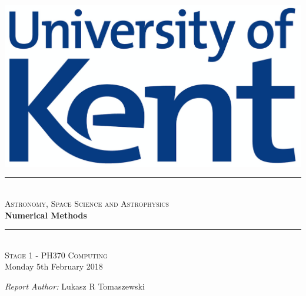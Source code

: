 \documentclass[12pt]{article}
\begin{document}
\begin{titlepage}

\newcommand{\HRule}{\rule{\linewidth}{0.5mm}}

\begin{centering} 
 

\includegraphics[scale=0.4]{Uni_of_Kent_Logo.png}\\[1cm]


\HRule \\[0.4cm]
\textsc{\large Astronomy, Space Science and Astrophysics}\\[0.4cm]
{\huge \bfseries Numerical Methods}\\[0.4cm]
\HRule \\[1.0cm]


\textsc{\Large Stage 1 - PH370 Computing}\\[0.5cm] 
{\large Monday 5th February 2018}\\[1.0cm]


\begin{minipage}{0.625\textwidth}
\centering

\emph{\large Report Author:} \large Lukasz R Tomaszewski \\ [0.2cm]
\end{minipage}\\[2cm]

\vfill
\end{centering} 
\end{titlepage}
\end{document}
